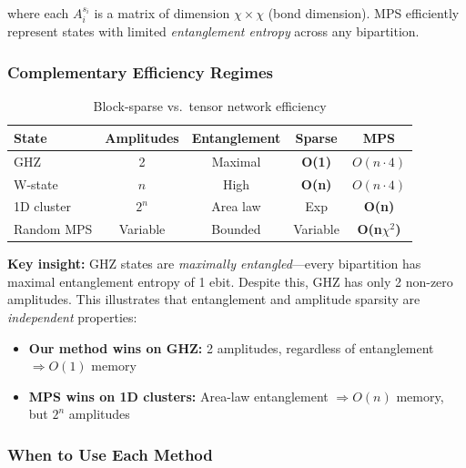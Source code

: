 \documentclass[11pt,twocolumn]{article}
\begin{document}
where each $A^{s_i}_i$ is a matrix of dimension $\chi \times \chi$ (bond dimension). MPS efficiently represent states with limited \emph{entanglement entropy} across any bipartition.

\subsubsection{Complementary Efficiency Regimes}

\begin{table}[H]
\centering
\caption{Block-sparse vs.\ tensor network efficiency}
\label{tab:tncomp}
\begin{tabular}{@{}lcccc@{}}
\toprule
State & Amplitudes & Entanglement & Sparse & MPS \\
\midrule
GHZ & 2 & Maximal & \textbf{O(1)} & $O(n \cdot 4)$ \\
W-state & $n$ & High & \textbf{O(n)} & $O(n \cdot 4)$ \\
1D cluster & $2^n$ & Area law & Exp & \textbf{O(n)} \\
Random MPS & Variable & Bounded & Variable & \textbf{O(n$\chi^2$)} \\
\bottomrule
\end{tabular}
\end{table}

\textbf{Key insight:} GHZ states are \emph{maximally entangled}---every bipartition has maximal entanglement entropy of 1 ebit. Despite this, GHZ has only 2 non-zero amplitudes. This illustrates that entanglement and amplitude sparsity are \emph{independent} properties:

\begin{itemize}
    \item \textbf{Our method wins on GHZ:} 2 amplitudes, regardless of entanglement $\Rightarrow O(1)$ memory
    \item \textbf{MPS wins on 1D clusters:} Area-law entanglement $\Rightarrow O(n)$ memory, but $2^n$ amplitudes
\end{itemize}

\subsubsection{When to Use Each Method}
\end{document}
